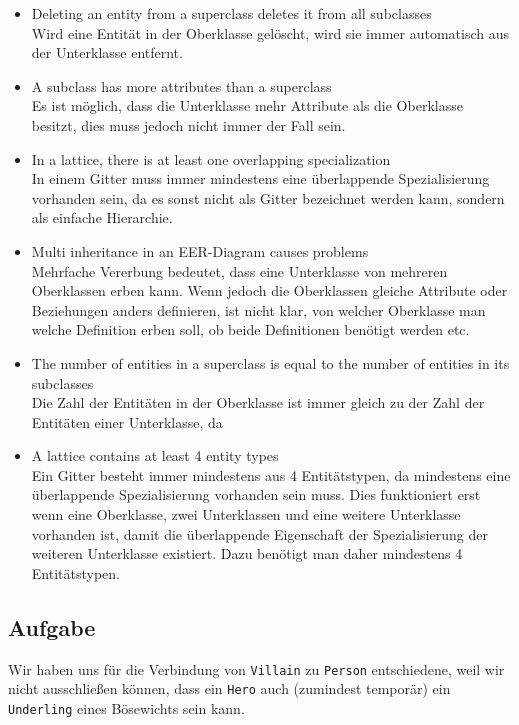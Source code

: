 \documentclass[11pt,a4paper,DIV=9]{scrartcl}
\newcounter{temp}
\newcommand{\aufgabe}[1]{
  \setcounter{temp}{\value{subsection}}
  \setcounter{subsection}{#1}
  \addtocounter{subsection}{-1}
  \subsection{Aufgabe}
  \setcounter{subsection}{\value{temp}}
}
\begin{document}
\begin{itemize}
 \item Deleting an entity from a superclass deletes it from all subclasses
 \\ Wird eine Entit\"at in der Oberklasse gel\"oscht, wird sie immer automatisch aus der Unterklasse entfernt. \\
 \item A subclass has more attributes than a superclass
 \\ Es ist m\"oglich, dass die Unterklasse mehr Attribute als die Oberklasse besitzt, dies muss jedoch nicht immer der Fall sein. \\
 \item In a lattice, there is at least one overlapping specialization
 \\ In einem Gitter muss immer mindestens eine \"uberlappende Spezialisierung vorhanden sein, da es sonst nicht als Gitter bezeichnet werden kann, sondern als einfache Hierarchie. \\
 \item Multi inheritance in an EER-Diagram causes problems
 \\ Mehrfache Vererbung bedeutet, dass eine Unterklasse von mehreren Oberklassen erben kann. Wenn jedoch die Oberklassen gleiche Attribute oder Beziehungen anders definieren, ist nicht klar, von welcher Oberklasse man welche Definition erben soll, ob beide Definitionen ben\"otigt werden etc. \\
 \item The number of entities in a superclass is equal to the number of entities in its subclasses
 \\ Die Zahl der Entit\"aten in der Oberklasse ist immer gleich zu der Zahl der Entit\"aten einer Unterklasse, da
 \item A lattice contains at least 4 entity types
 \\ Ein Gitter besteht immer mindestens aus 4 Entit\"atstypen, da mindestens eine \"uberlappende Spezialisierung vorhanden sein muss. Dies funktioniert erst wenn eine Oberklasse, zwei Unterklassen und eine weitere Unterklasse vorhanden ist, damit die \"uberlappende Eigenschaft der Spezialisierung der weiteren Unterklasse existiert. Dazu ben\"otigt man daher mindestens 4 Entit\"atstypen. \\
\end{itemize}
\aufgabe{4}

  Wir haben uns für die Verbindung von \texttt{Villain} zu \texttt{Person} entschiedene, weil wir nicht ausschließen können, dass ein \texttt{Hero} auch (zumindest temporär) ein \texttt{Underling} eines Bösewichts sein kann.\\
\end{document}
